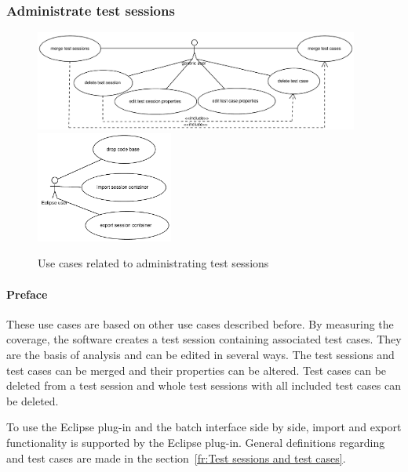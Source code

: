 \clearpage
\subsubsection{Administrate test sessions} \label{fr:Administrate test sessions}
\begin{figure}[htp]
 \centering
 \includegraphics[width=0.95\textwidth]{images/Use_Case_Models/administratetestsessions} \newline
 \includegraphics[width=0.4\textwidth]{images/Use_Case_Models/Eclipseadministration}
 \caption{Use cases related to administrating test sessions}
 \label{fr_fg:Use cases related to administrating test sessions}
\end{figure}

\paragraph{Preface}
These use cases are based on other use cases described before. By measuring the coverage, the software creates a test session containing associated test cases. They are the basis of analysis and can be edited in several ways. The test sessions and test cases can be merged and their properties can be altered. Test cases can be deleted from a test session and whole test sessions with all included test cases can be deleted.
\par
To use the Eclipse plug-in and the batch interface side by side, import and export functionality is supported by the Eclipse plug-in. General definitions regarding  and test cases are made in the section~\ref{fr:Test sessions and test cases}.

